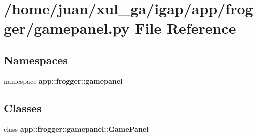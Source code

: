 \section{/home/juan/xul\_\-ga/igap/app/frogger/gamepanel.py File Reference}
\label{gamepanel_8py}
\subsection*{Namespaces}
\begin{CompactItemize}
\item 
namespace {\bf app::frogger::gamepanel}
\end{CompactItemize}
\subsection*{Classes}
\begin{CompactItemize}
\item 
class {\bf app::frogger::gamepanel::GamePanel}
\end{CompactItemize}
